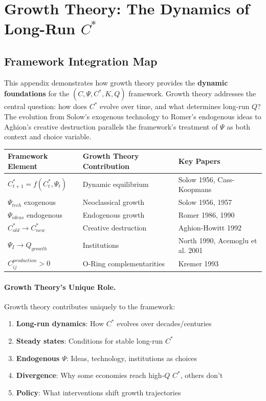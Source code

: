 \section{Growth Theory: The Dynamics of Long-Run $C^*$}
\label{app:growth-theory}

\subsection{Framework Integration Map}

This appendix demonstrates how growth theory provides the \textbf{dynamic foundations} 
for the $(C, \Psi, C^*, K, Q)$ framework. Growth theory addresses the central question: 
how does $C^*$ evolve over time, and what determines long-run $Q$? The evolution from 
Solow's exogenous technology to Romer's endogenous ideas to Aghion's creative destruction 
parallels the framework's treatment of $\Psi$ as both context and choice variable.

\begin{center}
\renewcommand{\arraystretch}{1.4}
\begin{tabular}{|l|l|l|}
\hline
\textbf{Framework Element} & \textbf{Growth Theory Contribution} & \textbf{Key Papers} \\
\hline
$C^*_{t+1} = f(C^*_t, \Psi_t)$ & Dynamic equilibrium & Solow 1956, Cass-Koopmans \\
$\Psi_{tech}$ exogenous & Neoclassical growth & Solow 1956, 1957 \\
$\Psi_{ideas}$ endogenous & Endogenous growth & Romer 1986, 1990 \\
$C^*_{old} \to C^*_{new}$ & Creative destruction & Aghion-Howitt 1992 \\
$\Psi_I \to Q_{growth}$ & Institutions & North 1990, Acemoglu et al. 2001 \\
$C_{ij}^{production} > 0$ & O-Ring complementarities & Kremer 1993 \\
\hline
\end{tabular}
\end{center}

\paragraph{Growth Theory's Unique Role.}
Growth theory contributes uniquely to the framework:
\begin{enumerate}
    \item \textbf{Long-run dynamics}: How $C^*$ evolves over decades/centuries
    \item \textbf{Steady states}: Conditions for stable long-run $C^*$
    \item \textbf{Endogenous $\Psi$}: Ideas, technology, institutions as choices
    \item \textbf{Divergence}: Why some economies reach high-$Q$ $C^*$, others don't
    \item \textbf{Policy}: What interventions shift growth trajectories
\end{enumerate}


